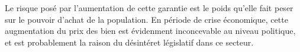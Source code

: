 
\smallbreak Le risque posé par l'aumentation de cette garantie est le poids qu'elle fait peser sur le pouvoir d'achat de la population.
En période de crise économique, cette augmentation du prix des bien est évidenment inconcevable au niveau politique, et est probablement la raison du désintéret législatif dans ce secteur.
